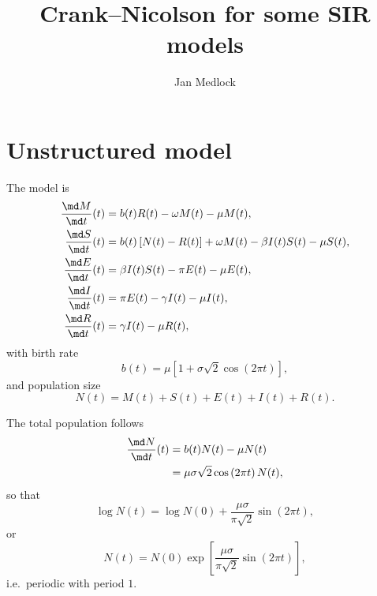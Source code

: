 \documentclass{jpmarticle}
\title{Crank--Nicolson for some SIR models}
\author{Jan Medlock}
\begin{document}
\maketitle

\section{Unstructured model}

The model is
\begin{equation}
  \label{model_unstructured}
  \begin{split}
    \frac{\md M}{\md t}(t) &=
    b(t) R(t) - \omega M(t) - \mu M(t),
    \\
    \frac{\md S}{\md t}(t) &=
    b(t) \left[N(t) - R(t)\right] + \omega M(t) - \beta I(t) S(t) - \mu S(t),
    \\
    \frac{\md E}{\md t}(t) &=
    \beta I(t) S(t) - \pi E(t) - \mu E(t),
    \\
    \frac{\md I}{\md t}(t) &=
    \pi E(t) - \gamma I(t) - \mu I(t),
    \\
    \frac{\md R}{\md t}(t) &=
    \gamma I(t) - \mu R(t),
  \end{split}
\end{equation}
with birth rate
\begin{equation}
  b(t) = \mu \left[
    1 + \sigma \sqrt{2} \cos\left(2 \pi t\right)
  \right],
\end{equation}
and population size
\begin{equation}
  N(t) = M(t) + S(t) + E(t) + I(t) + R(t).
\end{equation}

The total population follows
\begin{equation}
  \begin{split}
    \frac{\md N}{\md t}(t)
    &= b(t) N(t) - \mu N(t)
    \\
    &= \mu \sigma \sqrt{2} \cos\left(2 \pi t\right) N(t),
  \end{split}
\end{equation}
so that
\begin{equation}
  \log N(t) = \log N(0)
  + \frac{\mu \sigma}{\pi \sqrt{2}}
  \sin\left(2 \pi t\right),
\end{equation}
or
\begin{equation}
  N(t) = N(0) \exp\left[
    \frac{\mu \sigma}{\pi \sqrt{2}}
    \sin\left(2 \pi t\right)
  \right],
\end{equation}
i.e.~periodic with period $1$.
\end{document}
